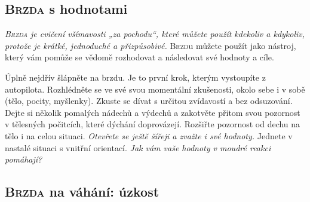 	\vskip-2mm
	\subsection{\textsc{Brzda} s hodnotami}
		\vskip-2mm
		\emph{\textup{\textsc{Brzda}} je cvičení všímavosti „za pochodu“, které můžete použít kdekoliv a kdykoliv, protože je krátké, jednoduché a přizpůsobivé.} \textup{\textsc{Brzd}}u můžete použít jako nástroj, který vám pomůže se vědomě rozhodovat a následovat své hodnoty a cíle.
		\begin{itemize*}[leftmargin=10mm]
		 Úplně nejdřív šlápněte na brzdu. Je to první krok, kterým vystoupíte z autopilota.
		 Rozhlédněte se ve své svou momentální zkušenosti, okolo sebe i v sobě (tělo, pocity, myšlenky). Zkuste se dívat s určitou zvídavostí a bez odsuzování.
		 Dejte si několik pomalých nádechů a výdechů a zakotvěte přitom svou pozornost v tělesných počitcích, které dýchání doprovázejí. %
		 Rozšiřte pozornost od dechu na tělo i na celou situaci. \emph{Otevřete se ještě šířeji a zvažte i své hodnoty.}
		 Jednete v nastalé situaci s vnitřní orientací. \emph{Jak vám vaše hodnoty v moudré reakci pomáhají?}
		\end{itemize*}
	\vfill

	\subsection{\textsc{Brzda} na váhání: úzkost}
	\clearpage
